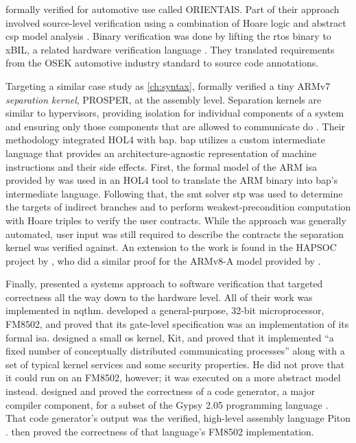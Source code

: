 \textcite{shi2012orientais} formally verified  for automotive use
called ORIENTAIS.
Part of their approach involved source-level verification
using a combination of Hoare logic
and abstract \ac{csp} model analysis \autocite{hoare1978csp}.
Binary verification was done by lifting the \ac{rtos} binary to xBIL,
a related hardware verification language \autocite{shi2012xbil}.
They translated requirements from the OSEK automotive industry standard
to source code annotations.

Targeting a similar case study as \cref{ch:syntax},
\textcite{dam2013hypervisor,dam2013formal}
formally verified a tiny ARMv7 \emph{separation kernel},%
PROSPER, at the assembly level.
Separation kernels are similar to hypervisors,
providing isolation for individual components of a system and ensuring
only those components that are allowed to communicate do \autocite{rushby1981dvss}.
Their methodology integrated HOL4 with \ac{bap}.
\Ac{bap} utilizes a custom intermediate language
that provides an architecture-agnostic representation of machine instructions
and their side effects.
First, the formal model of the ARM \ac{isa} provided by \textcite{fox2010arm} was used
in an HOL4 tool to translate the ARM binary into \ac{bap}'s intermediate language.
Following that, the \ac{smt} solver \ac{stp}  \autocite{ganesh2007stp}
was used to determine the targets of indirect branches
and to perform weakest-precondition computation with Hoare triples
to verify the user contracts.
While the approach was generally automated,
user input was still required to describe the contracts
the separation kernel was verified against.
An extension to the work is found in the HAPSOC project by \textcite{baumann2016high},
who did a similar proof for the ARMv8-A model provided by \textcite{fox2015improved}.

Finally, \textcite{bevier1989approach} presented a systems approach
to software verification that targeted correctness
all the way down to the hardware level.
All of their work was implemented in \ac{nqthm}.
\Textcite{hunt1989microprocessor} developed a general-purpose, 32-bit microprocessor,
FM8502, and proved that its gate-level specification
was an implementation of its formal \ac{isa}.
\Textcite{bevier1989short,bevier1989kit,bevier1987verified}
designed a small \ac{os} kernel, Kit, and proved that it implemented
``a fixed number of conceptually distributed communicating processes''
along with a set of typical kernel services and some security properties.
He did not prove that it could run on an FM8502, however;
it was executed on a more abstract model instead.
\Textcite{young1989generator} designed and proved the correctness of a code generator,
a major compiler component, for a subset of the Gypsy 2.05 programming language
\autocite{good1986gypsy}. That code generator's output was
the verified, high-level assembly language Piton \autocite{moore1988piton}.
\Textcite{moore1989language} then proved the correctness
of that language's FM8502 implementation.

